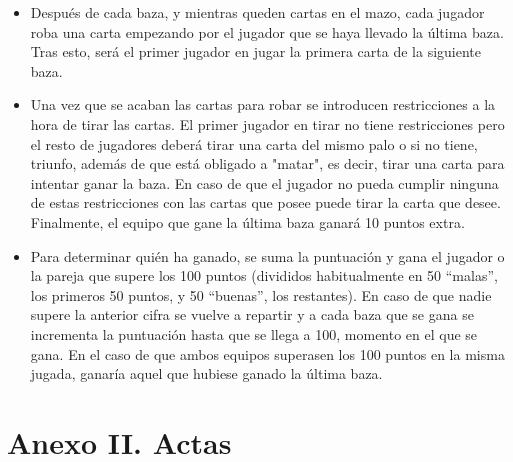 \documentclass[]{article}
\begin{document}
\begin{description}
\begin{itemize}
\item{Después de cada baza, y mientras queden cartas en el mazo, cada jugador roba una carta empezando por el jugador que se haya llevado la última baza. Tras esto, será el primer jugador en jugar la primera carta de la siguiente baza.}
\item{Una vez que se acaban las cartas para robar se introducen restricciones a la hora de tirar las cartas. El primer jugador en tirar no tiene restricciones pero el resto de jugadores deberá tirar una carta del mismo palo o si no tiene, triunfo, además de que está obligado a "matar", es decir, tirar una carta para intentar ganar la baza. En caso de que el jugador no pueda cumplir ninguna de estas restricciones con las cartas que posee puede tirar la carta que desee. Finalmente, el equipo que gane la última baza ganará 10 puntos extra.}
\item{Para determinar quién ha ganado, se suma la puntuación y gana el jugador o la pareja que supere los 100 puntos (divididos habitualmente en 50 “malas”, los primeros 50 puntos, y 50 “buenas”, los restantes). En caso de que nadie supere la anterior cifra se vuelve a repartir y a cada baza que se gana se incrementa la puntuación hasta que se llega a 100, momento en el que se gana. En el caso de que ambos equipos superasen los 100 puntos en la misma jugada, ganaría aquel que hubiese ganado la última baza.}
\end{itemize}
\end{description}
\clearpage
\section*{Anexo II. Actas}
\label{an2}






\clearpage
\end{document}
